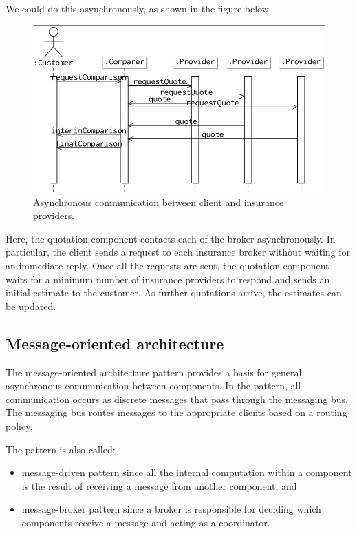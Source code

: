 \documentclass[a4paper, openany]{memoir}
\begin{document}
We could do this asynchronously, as shown in the figure below.
\begin{figure}[H]
    \centering
    \includegraphics[scale=0.45]{src/14.8 insurance 2.png}
    \caption{Asynchronous communication between client and insurance providers.}
\end{figure}
\noindent Here, the quotation component contacts each of the broker asynchronously. In particular, the client sends a request to each insurance broker without waiting for an immediate reply. Once all the requests are sent, the quotation component waits for a minimum number of insurance providers to respond and sends an initial estimate to the customer. As further quotations arrive, the estimates can be updated.

\subsection{Message-oriented architecture}
The message-oriented architecture pattern provides a basis for general asynchronous communication between components. In the pattern, all communication occurs as discrete messages that pass through the messaging bus. The messaging bus routes messages to the appropriate clients based on a routing policy. 

The pattern is also called:
\begin{itemize}
    \item message-driven pattern since all the internal computation within a component is the result of receiving a message from another component, and
    \item message-broker pattern since a broker is responsible for deciding which components receive a message and acting as a coordinator.
\end{itemize}
\end{document}
